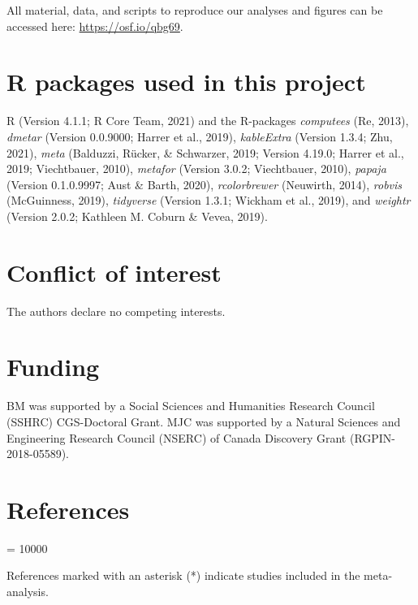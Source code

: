 \documentclass[
  english,
  man, donotrepeattitle,floatsintext]{apa7}
\begin{document}
\label{sec:sharing}
All material, data, and scripts to reproduce our analyses and figures can be accessed here: \url{https://osf.io/qbg69}.

\hypertarget{r-packages-used-in-this-project}{%
\section{R packages used in this project}\label{r-packages-used-in-this-project}}

R (Version 4.1.1; R Core Team, 2021) and the R-packages \emph{computees} (Re, 2013), \emph{dmetar} (Version 0.0.9000; Harrer et al., 2019), \emph{kableExtra} (Version 1.3.4; Zhu, 2021), \emph{meta} (Balduzzi, Rücker, \& Schwarzer, 2019; Version 4.19.0; Harrer et al., 2019; Viechtbauer, 2010), \emph{metafor} (Version 3.0.2; Viechtbauer, 2010), \emph{papaja} (Version 0.1.0.9997; Aust \& Barth, 2020), \emph{rcolorbrewer} (Neuwirth, 2014), \emph{robvis} (McGuinness, 2019), \emph{tidyverse} (Version 1.3.1; Wickham et al., 2019), and \emph{weightr} (Version 2.0.2; Kathleen M. Coburn \& Vevea, 2019).

\hypertarget{conflict-of-interest}{%
\section{Conflict of interest}\label{conflict-of-interest}}

The authors declare no competing interests.

\hypertarget{funding}{%
\section{Funding}\label{funding}}

BM was supported by a Social Sciences and Humanities Research Council (SSHRC) CGS-Doctoral Grant. MJC was supported by a Natural Sciences and Engineering Research Council (NSERC) of Canada Discovery Grant (RGPIN-2018-05589).

\hypertarget{references}{%
\section{References}\label{references}}

\begingroup
\interlinepenalty = 10000
\setlength{\parindent}{-0.5in}
\setlength{\leftskip}{0.5in}

References marked with an asterisk (*) indicate studies included in the meta-analysis.

\endgroup
\end{document}
